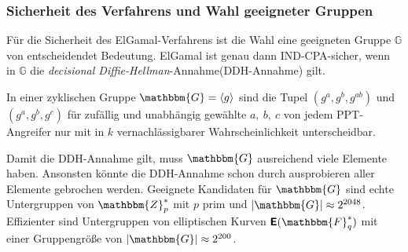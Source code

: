 \subsubsection{Sicherheit des Verfahrens und Wahl  geeigneter Gruppen}
Für die Sicherheit des ElGamal-Verfahrens ist die Wahl eine
geeigneten Gruppe $\mathbb{G}$ von entscheidendet Bedeutung. ElGamal ist genau
dann IND-CPA-sicher, wenn in $\mathbb{G}$ die \emph{decisional
  Diffie-Hellman}-Annahme(DDH-Annahme) gilt.
\begin{definition}
In einer zyklischen Gruppe $\mathbbm{G} = \langle g \rangle$ sind die Tupel
$(g^a, g^b, g^{ab})$ und $(g^a, g^b, g^c)$ für zufällig und unabhängig
gewählte $a,~b,~c$ von jedem PPT-Angreifer nur mit in $k$ vernachlässigbarer
Wahrscheinlichkeit unterscheidbar.
\end{definition}

Damit die DDH-Annahme gilt, muss $\mathbbm{G}$ ausreichend viele
Elemente haben. Ansonsten könnte die DDH-Annahme schon durch
ausprobieren aller Elemente gebrochen werden. Geeignete Kandidaten für
$\mathbbm{G}$ sind echte Untergruppen von $\mathbbm{Z}^*_p$ mit $p$ prim
und $|\mathbbm{G}| \approx 2^{2048}$. Effizienter sind Untergruppen von
elliptischen Kurven $\boldsymbol{\mathsf{E}}(\mathbbm{F}^*_q)$ mit einer
Gruppengröße von $|\mathbbm{G}| \approx 2^{200}$.

